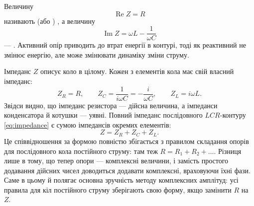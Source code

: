 %
%
%
%
%
%

Величину
\begin{equation}\label{eq:active_resistance}
	\operatorname{Re} Z = R
\end{equation}
називають  (або ) , а величину
\begin{equation}\label{eq:reactive_resistance}
	\operatorname{Im} Z = \omega L - \frac{1}{\omega C}
\end{equation}
--- . Активний опір приводить до втрат енергії в контурі, тоді як реактивний не змінює енергію, але може змінювати динаміку зміни струму.

Імпеданс $Z$ описує коло в цілому. Кожен з елементів кола має свій власний імпеданс:
\begin{equation}\label{eq:element_impedances}
	Z_R = R, \qquad Z_C = \frac{1}{i\omega C} = -\frac{i}{\omega C}, \qquad Z_L = i\omega L.
\end{equation}
Звідси видно, що імпеданс резистора --- дійсна величина, а імпеданси конденсатора й котушки --- уявні.  Повний імпеданс послідовного $LCR$-контуру \eqref{eq:impedance} є сумою імпедансів окремих елементів:
\begin{equation}\label{eq:impedance_sum}
	Z = Z_R + Z_C + Z_L.
\end{equation}
Це співвідношення за формою повністю збігається з правилом складання опорів для послідовного кола постійного струму: там теж $R = R_1 + R_2 + \dots$. Різниця лише в тому, що тепер опори --- комплексні величини, і замість простого додавання дійсних чисел доводиться додавати комплексні, враховуючи їхні фази. Саме в цьому й полягає основна зручність методу комплексних амплітуд: усі правила для кіл постійного струму зберігають свою форму, якщо замінити $R$ на $Z$.

